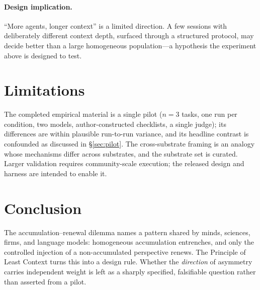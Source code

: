\documentclass[12pt]{article}
\begin{document}
\paragraph{Design implication.} ``More agents, longer context'' is a limited
direction. A few sessions with deliberately different context depth, surfaced
through a structured protocol, may decide better than a large homogeneous
population---a hypothesis the experiment above is designed to test.

\section{Limitations}

The completed empirical material is a single pilot ($n=3$ tasks, one run per
condition, two models, author-constructed checklists, a single judge); its
differences are within plausible run-to-run variance, and its headline contrast
is confounded as discussed in \S\ref{sec:pilot}. The cross-substrate framing is
an analogy whose mechanisms differ across substrates, and the substrate set is
curated. Larger validation requires community-scale execution; the released
design and harness are intended to enable it.

\section{Conclusion}

The accumulation--renewal dilemma names a pattern shared by minds, sciences,
firms, and language models: homogeneous accumulation entrenches, and only the
controlled injection of a non-accumulated perspective renews. The Principle of
Least Context turns this into a design rule. Whether the \emph{direction} of
asymmetry carries independent weight is left as a sharply specified, falsifiable
question rather than asserted from a pilot.



\end{document}
